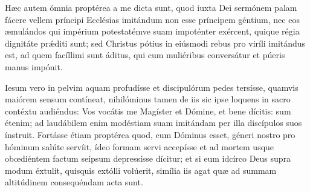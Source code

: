 {\noindent Hæc autem ómnia proptérea a me dicta sunt, quod iuxta Dei sermónem palam fácere vellem príncipi Ecclésias imitándum non esse príncipem géntium, nec eos æmulándos qui impérium potestatémve suam impoténter exércent, quique régia dignitáte pr\'{æ}diti sunt; sed Christus pótius in eiúsmodi rebus pro viríli imitándus est, ad quem facíllimi sunt áditus, qui cum muliéribus conversátur et púeris manus impónit.

\noindent Iesum vero in pelvim aquam profudísse et discipulórum pedes tersísse, quamvis maiórem sensum contíneat, nihilóminus tamen de iis sic ipse loquens in sacro contéxtu audiéndus: Vos vocátis me Magíster et Dómine, et bene dícitis: sum étenim; ad laudábilem enim modéstiam suam imitándam per illa discípulos suos ínstruit. Fortásse étiam proptérea quod, cum Dóminus esset, géneri nostro pro hóminum salúte servíit, ídeo formam servi accepísse et ad mortem usque obœdiéntem factum seípsum depressísse dícitur; et si eum idcírco Deus supra modum éxtulit, quisquis extólli volúerit, simília iis agat quæ ad summam altitúdinem consequéndam acta sunt.

\vfill
\pagebreak

 

\vspace{-5mm}


\vfill
\pagebreak
}
\newcommand{\responsoriumbreve}{\pars{Responsorium breve.}

\cuminitiali{VI}{temporalia/resp-christefilidei.gtex}}
\newcommand{\benedictus}{\pars{Canticum Zachariæ.} \scriptura{Mt. 20, 23; \textbf{H152}}

\vspace{-4mm}

\antiphona{VII a}{temporalia/ant-sedereautemmecum.gtex}

\vspace{-2mm}

\scriptura{Lc. 1, 68-79}

\vspace{-2mm}

\cantusSineNeumas
\initiumpsalmi{temporalia/benedictus-initium-viisoll-a-auto.gtex}


 \Abardot{}}


